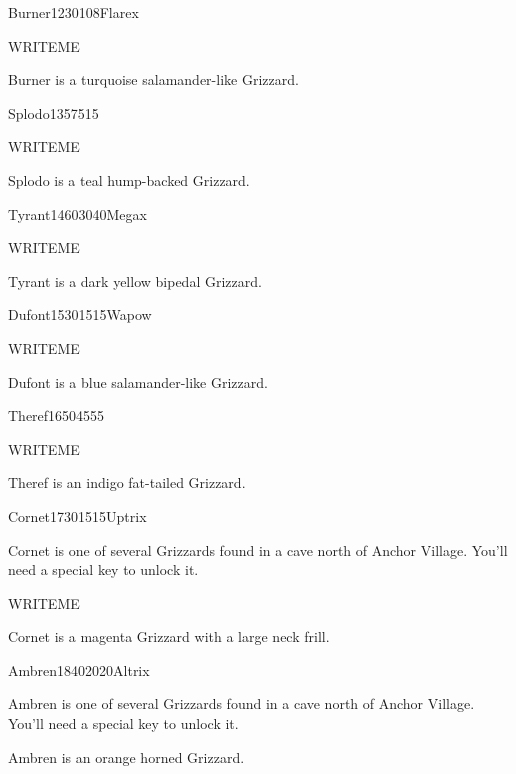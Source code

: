 \documentclass[10pt,twocolumn]{memoir}
\begin{document}
\begin{grizzardpage}{Burner}{12}{30}{10}{8}{Flarex}

WRITEME
  
  Burner is a turquoise salamander-like Grizzard.

\end{grizzardpage}

\begin{grizzardpage}{Splodo}{13}{5}{75}{15}{}

WRITEME
  
  Splodo is a teal hump-backed Grizzard.

\end{grizzardpage}

\begin{grizzardpage}{Tyrant}{14}{60}{30}{40}{Megax}

WRITEME
  
  Tyrant is a dark yellow bipedal Grizzard.

\end{grizzardpage}

\begin{grizzardpage}{Dufont}{15}{30}{15}{15}{Wapow}

WRITEME
  
  Dufont is a blue salamander-like Grizzard.

\end{grizzardpage}

\begin{grizzardpage}{Theref}{16}{50}{45}{55}{}

WRITEME
  
  Theref is an indigo fat-tailed Grizzard.

\end{grizzardpage}

\begin{grizzardpage}{Cornet}{17}{30}{15}{15}{Uptrix}

  Cornet is  one of several  Grizzards found in  a cave north  of Anchor
  Village. You'll need a special key to unlock it.

WRITEME
  
  Cornet is a magenta Grizzard with a large neck frill.

\end{grizzardpage}

\begin{grizzardpage}{Ambren}{18}{40}{20}{20}{Altrix}

  Ambren is  one of several  Grizzards found in  a cave north  of Anchor
  Village. You'll need a special key to unlock it.

  Ambren is an orange horned Grizzard.

\end{grizzardpage}
\end{document}
